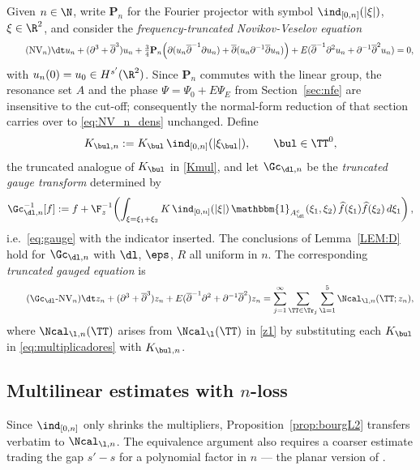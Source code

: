 Given $n\in\N$, write $\mathbf{P}_n$ for the Fourier projector with
symbol $\ind_{[0,n]}(|\xi|)$, $\xi\in\R^2$, and consider the
\emph{frequency-truncated Novikov-Veselov equation}
\begin{equation}\tag{NV$_n$}\label{eq:NV_n_dens}
\dt u_n + (\partial^3+\overline\partial^3) u_n
+ \tfrac34 \mathbf{P}_n\!\left( \partial(u_n\overline\partial^{-1}\partial u_n)
+ \overline\partial(u_n\partial^{-1}\overline\partial u_n) \right)
+ E(\overline\partial^{-1}\partial^2 u_n+\partial^{-1}\overline\partial^2 u_n)=0,
\end{equation}
with $u_n(0)=u_0\in H^{s'}(\R^2)$. Since $\mathbf{P}_n$ commutes
with the linear group, the resonance set $A$ and the phase
$\Psi=\Psi_0+E\Psi_E$ from Section~\ref{sec:nfe} are insensitive to
the cut-off; consequently the normal-form reduction of that section
carries over to \eqref{eq:NV_n_dens} unchanged. Define
\begin{equation}\label{eq:Kmul_n}
K_{\bul,n} := K_\bul\, \ind_{[0,n]}(|\xi_\bul|),
\qquad \bul\in\TT^0,
\end{equation}
the truncated analogue of $K_\bul$ in \eqref{Kmul}, and let
$\Gc_{\dl,n}$ be the \emph{truncated gauge transform} determined by
\begin{equation}\label{eq:gauge_n_dens}
\Gc_{\dl,n}^{-1}[f] := f + \F_z^{-1}\!\left( \int_{\xi=\xi_1+\xi_2}
K\,\ind_{[0,n]}(|\xi|)\, \mathbbm{1}_{A^c_\dl}(\xi_1,\xi_2)\,
\widehat f(\xi_1)\widehat f(\xi_2)\, d\xi_1 \right),
\end{equation}
i.e.\ \eqref{eq:gauge} with the indicator inserted. The conclusions
of Lemma~\ref{LEM:D} hold for $\Gc_{\dl,n}$ with $\dl$, $\eps$, $R$
all uniform in $n$. The corresponding \emph{truncated gauged
equation} is
\begin{equation}\label{eq:GNV_n_dens}\tag{$\Gc_\dl$-NV$_n$}
\dt z_n + (\partial^3+\overline\partial^3)z_n
+ E(\overline\partial^{-1}\partial^2+\partial^{-1}\overline\partial^2)z_n
= \sum_{j=1}^\infty \sum_{\TT\in\Tr_j}\sum_{\l=1}^5
\Ncal_{\l,n}(\TT;z_n),
\end{equation}
where $\Ncal_{\l,n}(\TT)$ arises from $\Ncal_\l(\TT)$ in \eqref{z1}
by substituting each $K_\bul$ in \eqref{eq:multiplicadores} with
$K_{\bul,n}$.

\subsection{Multilinear estimates with $n$-loss}

Since $\ind_{[0,n]}$ only shrinks the multipliers,
Proposition~\ref{prop:bourgL2} transfers verbatim to $\Ncal_{\l,n}$.
The equivalence argument also requires a coarser estimate trading
the gap $s'-s$ for a polynomial factor in $n$ --- the planar version
of \cite[Lemma~5.2]{chcora}.

